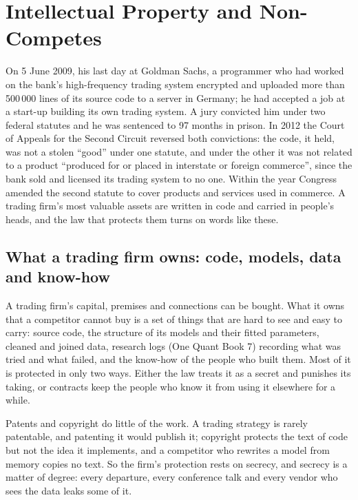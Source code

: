 \chapter{Intellectual Property and Non-Competes}\label{ch:fm:intellectual-property-and-non-competes}

On 5 June 2009, his last day at Goldman Sachs, a programmer who had worked on the bank's high-frequency trading system encrypted and uploaded
more than 500\,000 lines of its source code to a server in Germany; he had accepted a job at a start-up building its own trading system. A jury
convicted him under two federal statutes and he was sentenced to 97 months in prison. In 2012 the Court of Appeals for the Second Circuit reversed
both convictions: the code, it held, was not a stolen ``good'' under one statute, and under the other it was not related to a product ``produced
for or placed in interstate or foreign commerce'', since the bank sold and licensed its trading system to no one. Within the year Congress
amended the second statute to cover products and services used in commerce. A trading firm's most valuable assets are written in code and
carried in people's heads, and the law that protects them turns on words like these.

\section{What a trading firm owns: code, models, data and know-how}

A trading firm's capital, premises and connections can be bought. What it owns that a competitor cannot buy is a set of things that are hard to see
and easy to carry: source code, the structure of its models and their fitted parameters, cleaned and joined data, research logs (One Quant Book 7)
recording what was tried and what failed, and the know-how of the people who built them. Most of it is protected in only two ways. Either the law
treats it as a secret and punishes its taking, or contracts keep the people who know it from using it elsewhere for a while.

Patents and copyright do little of the work. A trading strategy is rarely patentable, and patenting it would publish it; copyright protects the
text of code but not the idea it implements, and a competitor who rewrites a model from memory copies no text. So the firm's protection rests on
secrecy, and secrecy is a matter of degree: every departure, every conference talk and every vendor who sees the data leaks some of it.

